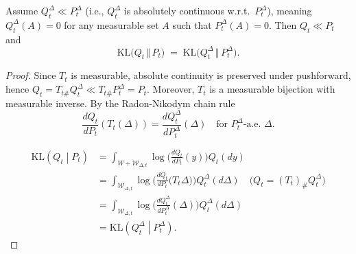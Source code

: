 \documentclass{article}
\begin{document}

\begin{lemma}
Assume $Q_t^\Delta \ll P_t^\Delta$ (i.e., $Q_t^\Delta$ is absolutely continuous w.r.t.\ $P_t^\Delta$), meaning $Q_t^\Delta(A)=0$ for any measurable set $A$ such that $P_t^\Delta(A)=0$.
Then $Q_t \ll P_t$ and
$$
\mathrm{KL}\bigl(Q_t\,\Vert\, P_t\bigr)
\;=\;
\mathrm{KL}\bigl(Q_t^\Delta \,\Vert\, P_t^\Delta\bigr).
$$
\end{lemma}

\begin{proof}
  Since $T_t$ is measurable, absolute continuity is preserved under pushforward, hence
$Q_t=T_{t\#}Q_t^\Delta \ll T_{t\#}P_t^\Delta=P_t$.
Moreover, $T_t$ is a measurable bijection with measurable inverse. 
  By the Radon-Nikodym chain rule
 \[
 \frac{dQ_t}{dP_t}(T_t(\Delta))=\frac{dQ_t^{\Delta}}{dP_t^{\Delta}}(\Delta)\quad\text{for }P^{\Delta}_t\text{-a.e.\ }\Delta.
 \]

\begin{equation*}
     \begin{aligned}
 \mathrm{KL}\left(Q_t\middle|P_t\right)
 &= \int_{W+\mathcal W_{\Delta,t}}
 \log\Big(\frac{dQ_t}{dP_t}(y)\Big)
 Q_t(dy)\\
 &= \int_{\mathcal W_{\Delta,t}}
 \log\Big(\frac{dQ_t}{dP_t}\big(T_t\Delta\big)\Big)
 Q_t^{\Delta}(d\Delta) \quad \text{(} Q_t=(T_t)_{\text{\#}}Q_t^{\Delta}\text{)} 
 \\
 &= \int_{\mathcal W_{\Delta,t}}
 \log\Big(\frac{dQ_t^{\Delta}}{dP_t^{\Delta}}(\Delta)\Big)
 Q_t^{\Delta}(d\Delta) \\
 &= \mathrm{KL}\left(Q_t^{\Delta}\middle|P_t^{\Delta}\right).
 \end{aligned}
\end{equation*} 
\end{proof}
\end{document}
